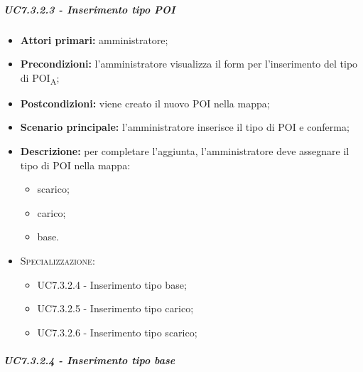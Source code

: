 \subparagraph{UC7.3.2.3 - Inserimento tipo POI}

\begin{itemize}

   \item   \textbf{Attori primari:} amministratore;

  \item   \textbf{Precondizioni:} l'amministratore visualizza il form per l'inserimento del tipo di POI\textsubscript{A};

   \item   \textbf{Postcondizioni:} viene creato il nuovo POI nella mappa; 

  \item   \textbf{Scenario principale:} l'amministratore inserisce il tipo di POI e conferma;

   \item   \textbf{Descrizione:} per completare l'aggiunta, l'amministratore deve assegnare il tipo di POI nella mappa:

  \begin{itemize}

       \item scarico;

       \item carico;

       \item base.
   \end{itemize}

   \item   \textsc{Specializzazione:}

   \begin{itemize}

       \item UC7.3.2.4 - Inserimento tipo base;

       \item UC7.3.2.5 - Inserimento tipo carico;

       \item UC7.3.2.6 - Inserimento tipo scarico;

   \end{itemize}



\end{itemize}



\subparagraph{UC7.3.2.4 - Inserimento tipo base}

